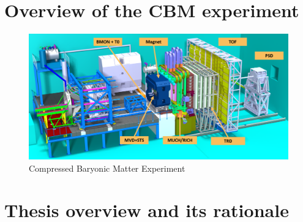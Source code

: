 \section{Overview of the CBM experiment}
\begin{figure}[!h]
    \centering
    \includegraphics[width=0.95\columnwidth]{Chapter1/images/CBMnew.png}
    \caption{Compressed Baryonic Matter Experiment}
    \label{fig:exp}
\end{figure}
\section{Thesis overview and its rationale}